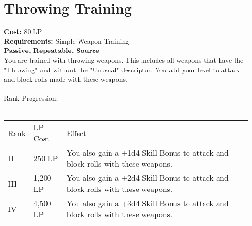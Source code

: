 \section{Throwing Training}\label{perk:throwingTraining}
\textbf{Cost:} 80 LP\\
\textbf{Requirements:} Simple Weapon Training\\
\textbf{Passive, Repeatable, Source}\\
You are trained with throwing weapons.
This includes all weapons that have the "Throwing" and without the "Unusual" descriptor.
You add your level to attack and block rolls made with these weapons.\\
\\
Rank Progression:\\
\\
\begin{longtable}{l | l | p{9cm}}
	Rank & LP Cost & Effect\\
	II & 250 LP & You also gain a +1d4 Skill Bonus to attack and block rolls with these weapons.\\
	III & 1,200 LP & You also gain a +2d4 Skill Bonus to attack and block rolls with these weapons.\\
	IV & 4,500 LP & You also gain a +3d4 Skill Bonus to attack and block rolls with these weapons.\\
\end{longtable}
